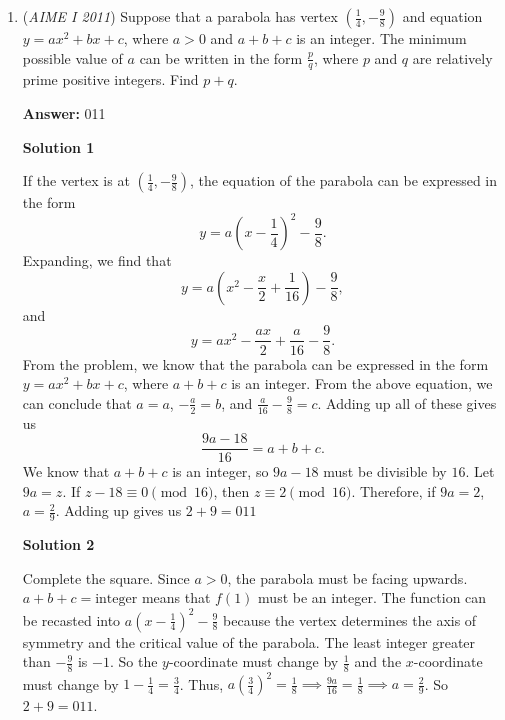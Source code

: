 \begin{enumerate}
 From the cyclic orientation of all these residues, it follows that $a \equiv d \equiv g \pmod{3}$, $b \equiv e \equiv h \pmod{3}$, and $c \equiv f \equiv i \pmod{3}$. Residue three classes for each give three ordered pairs congruent modulo 3, $(1,4,7),$ $(2,5,8),$ and $(3,6,9)$. Each of these pairs can be given to each of the ordered $(a,d,g)$, $(b,e,h)$, $(c,f,i)$. Each pair has $3!$ orderings, meaning there are $(3!)^3 = 216$ total combinations with one placement. Let $A,B,C =$ $(a,d,g)$, $(b,e,h)$, $(c,f,i)$, and an addition multiplicity of 6 is attributed to the previous 216 combinations, giving 1296 total. Each of these is not accounting for the multiplicity by the 9 rotations of the nonagon, and therefore there is a grand total of $\frac{1296}{9} = \boxed{144}$ distinct arrangements.

 


	\item (\textit{AIME I 2011}) Suppose that a parabola has vertex $\left(\frac{1}{4},-\frac{9}{8}\right)$ and equation $y = ax^2 + bx + c$, where $a > 0$ and $a + b + c$ is an integer.  The minimum possible value of $a$ can be written in the form $\frac{p}{q}$, where $p$ and $q$ are relatively prime positive integers.  Find $p + q$.


 
 \textbf{Answer: }011



\textbf{Solution 1}

If the vertex is at $\left(\frac{1}{4}, -\frac{9}{8}\right)$, the equation of the parabola can be expressed in the form 
 \[y=a\left(x-\frac{1}{4}\right)^2-\frac{9}{8}.\]Expanding, we find that 
 \[y=a\left(x^2-\frac{x}{2}+\frac{1}{16}\right)-\frac{9}{8},\] and 
 \[y=ax^2-\frac{ax}{2}+\frac{a}{16}-\frac{9}{8}.\] From the problem, we know that the parabola can be expressed in the form $y=ax^2+bx+c$, where $a+b+c$ is an integer. From the above equation, we can conclude that $a=a$, $-\frac{a}{2}=b$, and $\frac{a}{16}-\frac{9}{8}=c$. Adding up all of these gives us 
 \[\frac{9a-18}{16}=a+b+c.\] We know that $a+b+c$ is an integer, so $9a-18$ must be divisible by $16$.  Let $9a=z$. If ${z-18}\equiv {0} \pmod{16}$, then ${z}\equiv {2} \pmod{16}$. Therefore, if $9a=2$, $a=\frac{2}{9}$. Adding up gives us $2+9=\boxed{011}$




\textbf{Solution 2}

Complete the square. Since $a>0$, the parabola must be facing upwards. $a+b+c=\text{integer}$ means that $f(1)$ must be an integer. The function can be recasted into $a\left(x-\frac{1}{4}\right)^2-\frac{9}{8}$ because the vertex determines the axis of symmetry and the critical value of the parabola. The least integer greater than $-\frac{9}{8}$ is $-1$. So the $y$-coordinate must change by $\frac{1}{8}$ and the $x$-coordinate must change by $1-\frac{1}{4}=\frac{3}{4}$. Thus, $a\left(\frac{3}{4}\right)^2=\frac{1}{8}\implies \frac{9a}{16}=\frac{1}{8}\implies a=\frac{2}{9}$. So $2+9=\boxed{011}$.


\end{enumerate}

